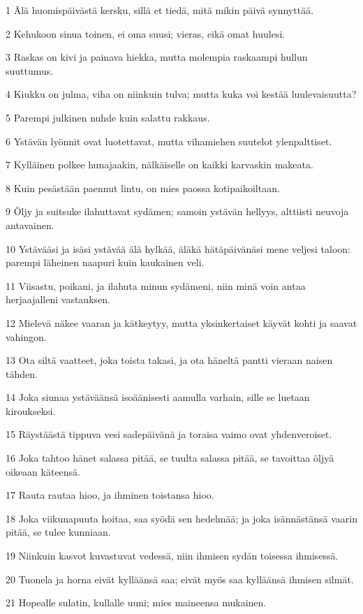 \par 1 Älä huomispäivästä kersku, sillä et tiedä, mitä mikin päivä synnyttää.
\par 2 Kehukoon sinua toinen, ei oma suusi; vieras, eikä omat huulesi.
\par 3 Raskas on kivi ja painava hiekka, mutta molempia raskaampi hullun suuttumus.
\par 4 Kiukku on julma, viha on niinkuin tulva; mutta kuka voi kestää luulevaisuutta?
\par 5 Parempi julkinen nuhde kuin salattu rakkaus.
\par 6 Ystävän lyönnit ovat luotettavat, mutta vihamiehen suutelot ylenpalttiset.
\par 7 Kylläinen polkee hunajaakin, nälkäiselle on kaikki karvaskin makeata.
\par 8 Kuin pesästään paennut lintu, on mies paossa kotipaikoiltaan.
\par 9 Öljy ja suitsuke ilahuttavat sydämen; samoin ystävän hellyys, alttiisti neuvoja antavainen.
\par 10 Ystävääsi ja isäsi ystävää älä hylkää, äläkä hätäpäivänäsi mene veljesi taloon: parempi läheinen naapuri kuin kaukainen veli.
\par 11 Viisastu, poikani, ja ilahuta minun sydämeni, niin minä voin antaa herjaajalleni vastauksen.
\par 12 Mielevä näkee vaaran ja kätkeytyy, mutta yksinkertaiset käyvät kohti ja saavat vahingon.
\par 13 Ota siltä vaatteet, joka toista takasi, ja ota häneltä pantti vieraan naisen tähden.
\par 14 Joka siunaa ystäväänsä isoäänisesti aamulla varhain, sille se luetaan kiroukseksi.
\par 15 Räystäästä tippuva vesi sadepäivänä ja toraisa vaimo ovat yhdenveroiset.
\par 16 Joka tahtoo hänet salassa pitää, se tuulta salassa pitää, se tavoittaa öljyä oikeaan käteensä.
\par 17 Rauta rautaa hioo, ja ihminen toistansa hioo.
\par 18 Joka viikunapuuta hoitaa, saa syödä sen hedelmää; ja joka isännästänsä vaarin pitää, se tulee kunniaan.
\par 19 Niinkuin kasvot kuvastuvat vedessä, niin ihmisen sydän toisessa ihmisessä.
\par 20 Tuonela ja horna eivät kylläänsä saa; eivät myös saa kylläänsä ihmisen silmät.
\par 21 Hopealle sulatin, kullalle uuni; mies maineensa mukainen.

